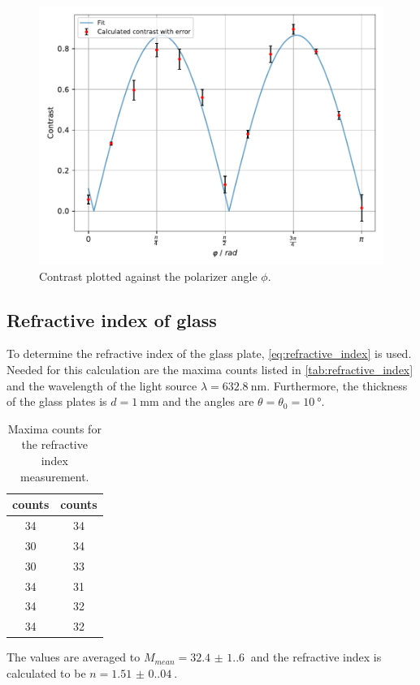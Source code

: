 \begin{figure}[H]
  \centering
  \includegraphics[width=\textwidth]{../build/contrast.pdf}
  \caption{Contrast plotted against the polarizer angle $\phi$.}
  \label{fig:contrast}
\end{figure}

\newpage

\subsection{Refractive index of glass}
To determine the refractive index of the glass plate, \autoref{eq:refractive_index} is used. 
Needed for this calculation are the maxima counts listed in \autoref{tab:refractive_index} and the wavelength of the light source $\lambda = \SI{632.8}{\nano\meter}$.
Furthermore, the thickness of the glass plates is $d = \SI{1}{\milli\meter}$ and the angles are $\theta = \theta_0 = \SI{10}{\degree}$.
\begin{table}[H]
  \centering
  \begin{tabular}{c|c}\hline
    \hline
    counts & counts \\ \hline
    34 & 34 \\ \hline
    30 & 34 \\ \hline
    30 & 33 \\ \hline
    34 & 31 \\ \hline
    34 & 32 \\ \hline
    34 & 32 \\ \hline
  \end{tabular}
  \caption{Maxima counts for the refractive index measurement.}
  \label{tab:refractive_index}
\end{table}
The values are averaged to $M_{mean} = \SI{32.4(1.6)}{}$ and the refractive index is calculated to be $n = \SI{1.51(0.04)}{}$.
\newpage
